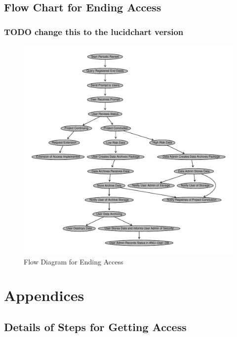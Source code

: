\documentclass[a4paper]{article}
\begin{document}
\subsection{Flow Chart for Ending Access}
\label{sec-4-1}
\subsubsection{\textbf{TODO} change this to the lucidchart version}
\label{sec-4-1-1}


\begin{figure}[!h]
\centering
\includegraphics[width=\textwidth]{DataAccessFlowDiagram-EndAccess.pdf}
\caption{Flow Diagram for Ending Access}
\label{fig:DataAccessFlowDiagram-EndAccess}
\end{figure}
\clearpage
\section{Appendices}
\label{sec-5}
\subsection{Details of Steps for Getting Access}
\label{sec-5-1}
\end{document}
